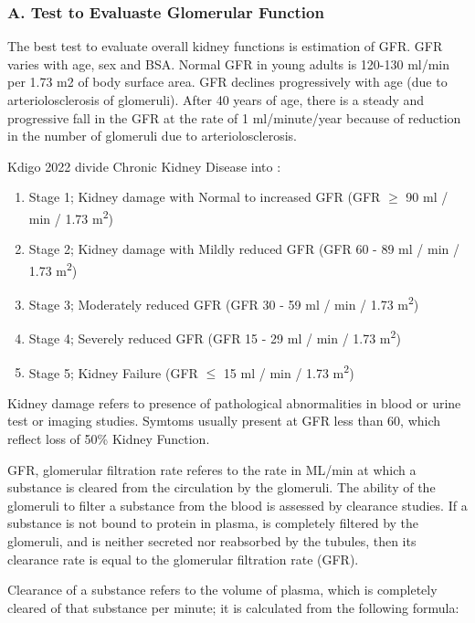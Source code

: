 \documentclass[
  letterpaper,
  DIV=11,
  numbers=noendperiod]{scrreprt}
\begin{document}
\subsubsection{A. Test to Evaluaste Glomerular
Function}\label{a.-test-to-evaluaste-glomerular-function}

The best test to evaluate overall kidney functions is estimation of GFR.
GFR varies with age, sex and BSA. Normal GFR in young adults is 120-130
ml/min per 1.73 m2 of body surface area. GFR declines progressively with
age (due to arteriolosclerosis of glomeruli). After 40 years of age,
there is a steady and progressive fall in the GFR at the rate of 1
ml/minute/year because of reduction in the number of glomeruli due to
arteriolosclerosis.

Kdigo 2022 divide Chronic Kidney Disease into :

\begin{enumerate}
\def\labelenumi{\arabic{enumi}.}
\item
  Stage 1; Kidney damage with Normal to increased GFR (GFR \(\geq\) 90
  ml / min / 1.73 m\textsuperscript{2})
\item
  Stage 2; Kidney damage with Mildly reduced GFR (GFR 60 - 89 ml / min /
  1.73 m\textsuperscript{2})
\item
  Stage 3; Moderately reduced GFR (GFR 30 - 59 ml / min / 1.73
  m\textsuperscript{2})
\item
  Stage 4; Severely reduced GFR (GFR 15 - 29 ml / min / 1.73
  m\textsuperscript{2})
\item
  Stage 5; Kidney Failure (GFR \(\leq\) 15 ml / min / 1.73
  m\textsuperscript{2})
\end{enumerate}

Kidney damage refers to presence of pathological abnormalities in blood
or urine test or imaging studies. Symtoms usually present at GFR less
than 60, which reflect loss of 50\% Kidney Function.

GFR, glomerular filtration rate referes to the rate in ML/min at which a
substance is cleared from the circulation by the glomeruli. The ability
of the glomeruli to filter a substance from the blood is assessed by
clearance studies. If a substance is not bound to protein in plasma, is
completely filtered by the glomeruli, and is neither secreted nor
reabsorbed by the tubules, then its clearance rate is equal to the
glomerular filtration rate (GFR).

Clearance of a substance refers to the volume of plasma, which is
completely cleared of that substance per minute; it is calculated from
the following formula:
\end{document}
